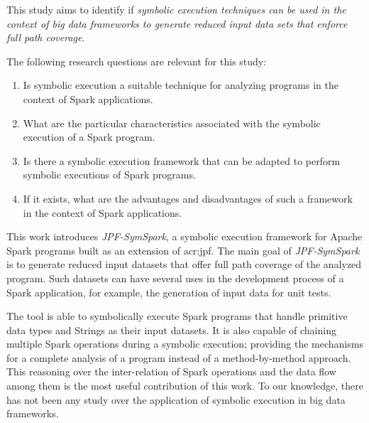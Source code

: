 \label{ch:introduction}




This study aims to identify if \textit{symbolic execution techniques can be used in the context of big data frameworks to generate reduced input data sets that enforce full path coverage}.


The following research questions are relevant for this study:

\begin{enumerate}
	\item Is symbolic execution a suitable technique for analyzing programs in the context of Spark applications.
	\item What are the particular characteristics associated with the symbolic execution of a Spark program.
	\item Is there a symbolic execution framework that can be adapted to perform symbolic executions of Spark programs.
	\item If it exists, what are the advantages and disadvantages of such a framework in the context of Spark applications.	
\end{enumerate}

\label{sec:contributions}

This work introduces \textit{JPF-SymSpark}, a symbolic execution framework for Apache Spark programs built as an extension of \acrfull{acr:jpf}. The main goal of \textit{JPF-SymSpark} is to generate reduced input datasets that offer full path coverage of the analyzed program. Such datasets can have several uses in the development process of a Spark application, for example, the generation of input data for unit tests.

The tool is able to symbolically execute Spark programs that handle primitive data types and Strings as their input datasets. It is also capable of chaining multiple Spark operations during a symbolic execution; providing the mechanisms for a complete analysis of a program instead of a method-by-method approach. This reasoning over the inter-relation of Spark operations and the data flow among them is the most useful contribution of this work. To our knowledge, there has not been any study over the application of symbolic execution in big data frameworks.

